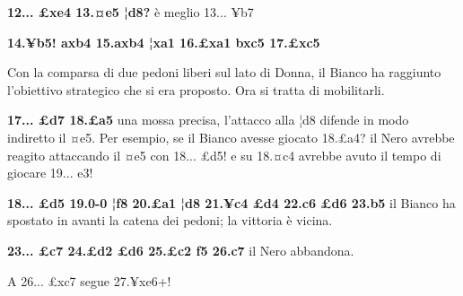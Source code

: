 \textbf{12... £xe4 13.¤e5 ¦d8?} è meglio 13... ¥b7

\textbf{14.¥b5! axb4 15.axb4 ¦xa1 16.£xa1 bxc5 17.£xc5}


Con la comparsa di due pedoni liberi sul lato di Donna, il Bianco ha
raggiunto l'obiettivo strategico che si era proposto. Ora si tratta di
mobilitarli.

\textbf{17... £d7 18.£a5} una mossa precisa, l'attacco alla ¦d8 difende
in modo indiretto il ¤e5. Per esempio, se il Bianco avesse giocato
18.£a4? il Nero avrebbe reagito attaccando il ¤e5 con 18... £d5! e su
18.¤c4 avrebbe avuto il tempo di giocare 19... e3!

\textbf{18... £d5 19.0-0 ¦f8 20.£a1 ¦d8 21.¥c4 £d4 22.c6 £d6 23.b5} il
Bianco ha spostato in avanti la catena dei pedoni; la vittoria è vicina.

\textbf{23... £c7 24.£d2 £d6 25.£c2 f5 26.c7} il Nero abbandona.


A 26... £xc7 segue 27.¥xe6+!
